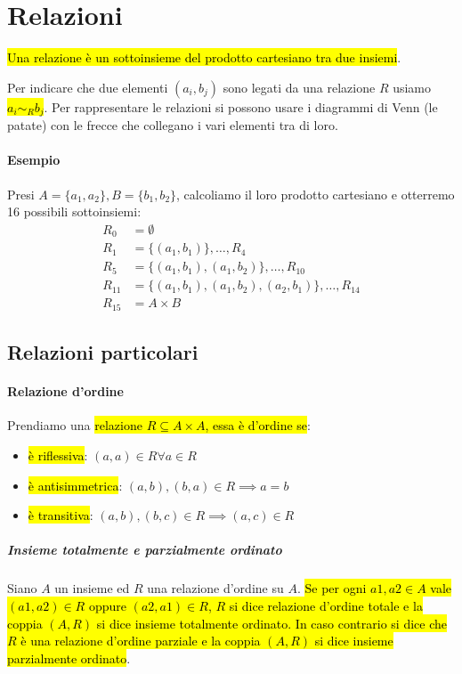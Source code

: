 \section{Relazioni}
\hl{Una relazione è un sottoinsieme del prodotto cartesiano tra due insiemi}.

Per indicare che due elementi $(a_i, b_j)$ sono legati da una relazione
$R$ usiamo \hl{$a_i \sim_R b_j$}. Per rappresentare le relazioni si possono usare i
diagrammi di Venn (le patate) con le frecce che collegano i vari elementi tra di
loro.

\paragraph{Esempio} Presi $A = \{a_1, a_2\}, B = \{b_1, b_2\}$, calcoliamo il
loro prodotto cartesiano e otterremo 16 possibili sottoinsiemi:
\begin{align*}
    R_0 &= \emptyset \\
    R_1 &= \{(a_1, b_1)\}, \dots, R_4 \\
    R_5 &= \{(a_1, b_1), (a_1, b_2)\}, \dots, R_{10} \\
    R_{11} &= \{(a_1, b_1), (a_1, b_2), (a_2, b_1)\}, \dots, R_{14} \\
    R_{15} &= A \times B
\end{align*}

\subsection{Relazioni particolari}
\paragraph{Relazione d'ordine} Prendiamo una \hl{relazione
$R \subseteq A \times A$, essa è d'ordine se}:
\begin{itemize}
    \item \hl{è riflessiva}: $(a,a) \in R \forall a \in R$
    \item \hl{è antisimmetrica}: $(a,b),(b,a) \in R \implies a=b$
    \item \hl{è transitiva}: $(a,b), (b,c) \in R \implies (a,c) \in R$
\end{itemize}

\subparagraph{Insieme totalmente e parzialmente ordinato} Siano $A$ un insieme ed
$R$ una relazione d’ordine su $A$. \hl{Se per ogni $a1 , a2 \in A$ vale
$(a1, a2) \in R$ oppure $(a2 , a1 ) \in R$, $R$ si dice relazione d’ordine
totale e la coppia $(A, R)$ si dice insieme totalmente ordinato. In caso
contrario si dice che $R$ è una relazione d’ordine parziale e la coppia $(A, R)$
si dice insieme parzialmente ordinato}.

